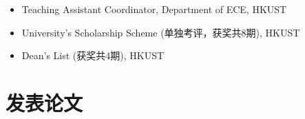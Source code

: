 \documentclass{mycv}
\begin{document}
\begin{itemize}
  \item Teaching Assistant Coordinator, Department of ECE, HKUST 
  \item University's Scholarship Scheme (单独考评，获奖共8期), HKUST
  \item Dean's List (获奖共4期), HKUST
\end{itemize}

\section{发表论文}%


\end{document}
